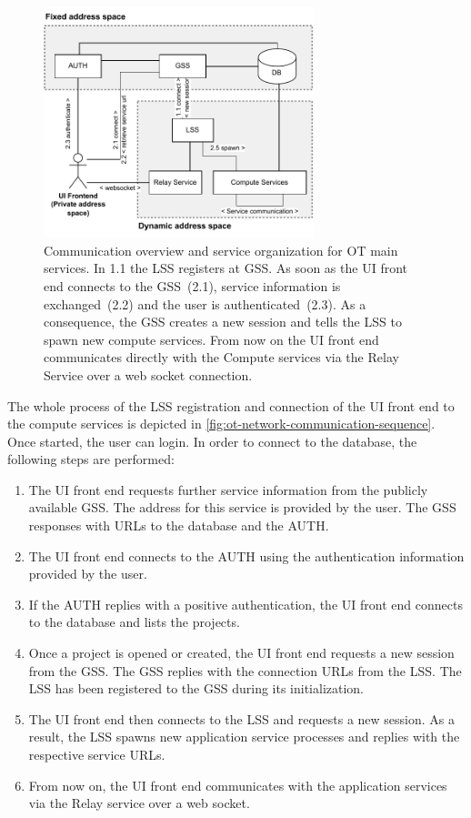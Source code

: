 \begin{figure}[h]
	\centering
	\includegraphics[width=0.7\textwidth]{Figures/opentwin-network-communication-diagram.pdf}
	\caption{Communication overview and service organization for \ac{OT} main services. In 1.1 the \ac{LSS} registers at \ac{GSS}. As soon as the \ac{UI} front end connects to the \ac{GSS}~(2.1), service information is exchanged~(2.2) and the user is authenticated~(2.3). As a consequence, the \ac{GSS} creates a new session and tells the \ac{LSS} to spawn new compute services. From now on the \ac{UI} front end communicates directly with the Compute services via the Relay Service over a web socket connection.}
	\label{fig:ot-network-communication-diagram}
\end{figure}


The whole process of the \ac{LSS} registration and connection of the \ac{UI} front end to the compute services is depicted in \autoref{fig:ot-network-communication-sequence}.
Once started, the user can login. In order to connect to the database, the following steps are performed:
\begin{enumerate}
\item The \ac{UI} front end requests further service information from the publicly available \ac{GSS}. The address for this service is provided by the user. The \ac{GSS} responses with \acp{URL} to the database and the \ac{AUTH}.
\item The \ac{UI} front end connects to the \ac{AUTH} using the authentication information provided by the user.
\item If the \ac{AUTH} replies with a positive authentication, the \ac{UI} front end connects to the database and lists the projects.
\item Once a project is opened or created, the \ac{UI} front end requests a new session from the \ac{GSS}. The \ac{GSS} replies with the connection \acp{URL} from the \ac{LSS}. The \ac{LSS} has been registered to the \ac{GSS} during its initialization.
\item The \ac{UI} front end then connects to the \ac{LSS} and requests a new session. As a result, the \ac{LSS} spawns new application service processes and replies with the respective service \acp{URL}.
\item From now on, the \ac{UI} front end communicates with the application services via the Relay service over a web socket.
\end{enumerate}

